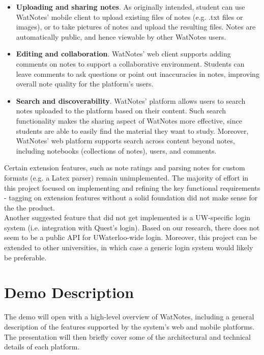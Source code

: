 \documentclass[12pt]{article}
\begin{document}
    \begin{itemize}
      \item
        \textbf{Uploading and sharing notes}. As originally intended, student can use WatNotes' mobile client to upload existing
        files of notes (e.g. .txt files or images), or to take pictures of notes and upload the resulting files. Notes are
        automatically public, and hence viewable by other WatNotes users.
      \item
        \textbf{Editing and collaboration}. WatNotes' web client supports adding comments on notes to support a collaborative environment.
        Students can leave comments to ask questions or point out inaccuracies in notes, improving overall note quality for
        the platform's users.
      \item
        \textbf{Search and discoverability}. WatNotes' platform allows users to search notes uploaded to the platform based on their content.
        Such search functionality makes the sharing aspect of WatNotes more effective, since students are able to easily find the
        material they want to study. Moreover, WatNotes' web platform supports search across content beyond notes, including notebooks
        (collections of notes), users, and comments.
    \end{itemize}

    Certain extension features, such as note ratings and parsing notes for custom formats (e.g. a Latex parser) remain unimplemented.
    The majority of effort in this project focused on implementing and refining the key functional requirements - tagging on extension
    features without a solid foundation did not make sense for the the product. \\

    Another suggested feature that did not get implemented is a UW-specific login system (i.e. integration with Quest's login).
    Based on our research, there does not seem to be a public API for UWaterloo-wide login. Moreover, this project can be extended
    to other universities, in which case a generic login system would likely be preferable.
  \newpage

  \section{Demo Description}
    The demo will open with a high-level overview of WatNotes, including a general description of the features supported by the system's web
    and mobile platforms. The presentation will then briefly cover some of the architectural and technical details of each platform. \\
    
\end{document}
